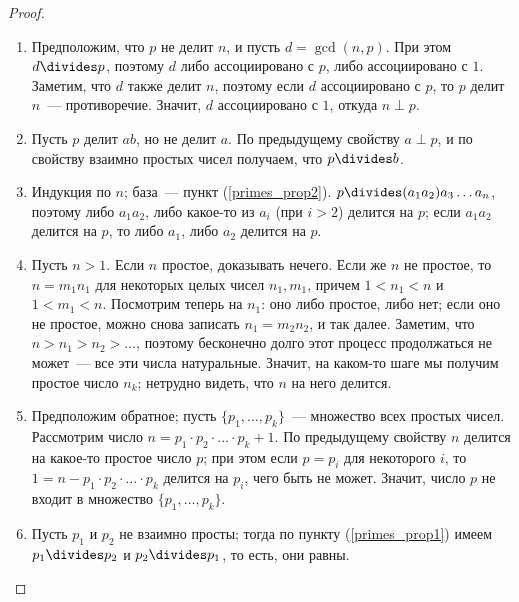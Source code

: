 \begin{proof}
\begin{enumerate}
\item Предположим, что $p$ не делит $n$, и пусть $d=\gcd(n,p)$. При
  этом $d\divides p$, поэтому $d$ либо
  ассоциировано с $p$, либо ассоциировано с $1$. Заметим, что $d$
  также делит $n$, поэтому если $d$ ассоциировано
  с $p$, то $p$ делит $n$~--- противоречие. Значит, $d$
  ассоциировано с $1$, откуда $n\perp p$.
\item Пусть $p$ делит $ab$, но не делит $a$. По
  предыдущему свойству $a\perp p$, и по свойству взаимно простых чисел
  получаем, что $p\divides b$.
\item Индукция по $n$; база~--- пункт
  (\ref{primes_prop2}). $p\divides (a_1a_2)a_3\dots a_n$,
  поэтому либо $a_1a_2$, либо какое-то из $a_i$ (при $i>2$) делится
  на $p$; если $a_1a_2$ делится на $p$, то либо $a_1$, либо $a_2$
  делится на $p$.
\item Пусть $n>1$. Если $n$ простое, доказывать нечего. Если же $n$ не
  простое, то $n=m_1n_1$ для некоторых целых чисел $n_1,m_1$, причем
  $1<n_1<n$ и $1<m_1<n$. Посмотрим теперь на $n_1$: оно либо простое,
  либо нет; если оно не простое, можно снова записать $n_1=m_2n_2$, и
  так далее. Заметим, что $n>n_1>n_2>\dots$, поэтому бесконечно долго
  этот процесс продолжаться не может~--- все эти числа
  натуральные. Значит, на каком-то шаге мы получим простое число
  $n_k$; нетрудно видеть, что $n$ на него делится.
\item Предположим обратное; пусть $\{p_1,\dots,p_k\}$~---  множество
  всех простых чисел. Рассмотрим число $n=p_1\cdot
  p_2\cdot\dots\cdot p_k+1$. По предыдущему свойству $n$ делится на
  какое-то простое число $p$; при этом если $p=p_i$ для некоторого
  $i$, то $1=n-p_1\cdot p_2\cdot\dots\cdot p_k$ делится на $p_i$, чего
  быть не может. Значит, число $p$ не входит в множество
  $\{p_1,\dots,p_k\}$.
\item Пусть $p_1$ и $p_2$ не взаимно просты; тогда по пункту
  (\ref{primes_prop1}) имеем $p_1\divides p_2$ и $p_2\divides p_1$, то
  есть, они равны.
\end{enumerate}
\end{proof}

